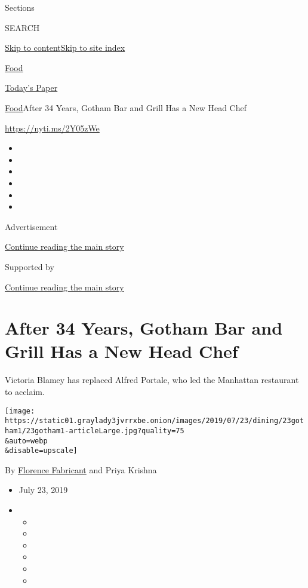 Sections

SEARCH

\protect\hyperlink{site-content}{Skip to
content}\protect\hyperlink{site-index}{Skip to site index}

\href{https://www.nytimes3xbfgragh.onion/section/food}{Food}

\href{https://myaccount.nytimes3xbfgragh.onion/auth/login?response_type=cookie\&client_id=vi}{}

\href{https://www.nytimes3xbfgragh.onion/section/todayspaper}{Today's
Paper}

\href{/section/food}{Food}\textbar{}After 34 Years, Gotham Bar and Grill
Has a New Head Chef

\url{https://nyti.ms/2Y05zWe}

\begin{itemize}
\item
\item
\item
\item
\item
\item
\end{itemize}

Advertisement

\protect\hyperlink{after-top}{Continue reading the main story}

Supported by

\protect\hyperlink{after-sponsor}{Continue reading the main story}

\hypertarget{after-34-years-gotham-bar-and-grill-has-a-new-head-chef}{%
\section{After 34 Years, Gotham Bar and Grill Has a New Head
Chef}\label{after-34-years-gotham-bar-and-grill-has-a-new-head-chef}}

Victoria Blamey has replaced Alfred Portale, who led the Manhattan
restaurant to acclaim.

\texttt{[image: https://static01.graylady3jvrrxbe.onion/images/2019/07/23/dining/23gotham1/23gotham1-articleLarge.jpg?quality=75\\\&auto=webp\\\&disable=upscale]}

By
\href{https://www.nytimes3xbfgragh.onion/by/florence-fabricant}{Florence
Fabricant} and Priya Krishna

\begin{itemize}
\item
  July 23, 2019
\item
  \begin{itemize}
  \item
  \item
  \item
  \item
  \item
  \item
  \end{itemize}
\end{itemize}

